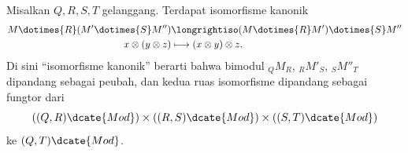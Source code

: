 \begin{proposition}\label{prop:tensor-assoc}
	Misalkan $Q, R, S, T$ gelanggang. Terdapat isomorfisme kanonik
	\begin{align*}
		M \dotimes{R} (M' \dotimes{S} M'') & \longrightiso (M \dotimes{R} M') \dotimes{S} M'' \\
		x \otimes (y \otimes z) & \longmapsto (x \otimes y) \otimes z.
	\end{align*}
	Di sini ``isomorfisme kanonik'' berarti bahwa bimodul ${}_Q M_R$, ${}_R M'_S$, ${}_S M''_T$ dipandang sebagai peubah, dan kedua ruas isomorfisme dipandang sebagai fungtor dari
	\[ \left( (Q, R)\dcate{Mod} \right) \times \left( (R, S)\dcate{Mod} \right) \times \left( (S, T)\dcate{Mod} \right) \]
	ke $(Q, T)\dcate{Mod}$.
\end{proposition}

